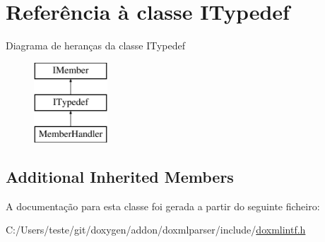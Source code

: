 \hypertarget{class_i_typedef}{\section{Referência à classe I\-Typedef}
\label{class_i_typedef}
}
Diagrama de heranças da classe I\-Typedef\begin{figure}[H]
\begin{center}
\leavevmode
\includegraphics[height=3.000000cm]{class_i_typedef}
\end{center}
\end{figure}
\subsection*{Additional Inherited Members}


A documentação para esta classe foi gerada a partir do seguinte ficheiro\-:\begin{DoxyCompactItemize}
\item 
C\-:/\-Users/teste/git/doxygen/addon/doxmlparser/include/\hyperlink{include_2doxmlintf_8h}{doxmlintf.\-h}\end{DoxyCompactItemize}
